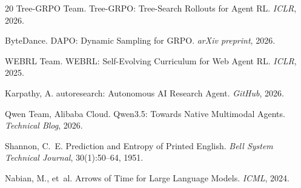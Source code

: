 \documentclass[11pt]{article}
\begin{document}
\begin{thebibliography}{20}
Tree-GRPO Team.
\newblock Tree-GRPO: Tree-Search Rollouts for Agent RL.
\newblock \emph{ICLR}, 2026.

ByteDance.
\newblock DAPO: Dynamic Sampling for GRPO.
\newblock \emph{arXiv preprint}, 2026.

WEBRL Team.
\newblock WEBRL: Self-Evolving Curriculum for Web Agent RL.
\newblock \emph{ICLR}, 2025.

Karpathy, A.
\newblock autoresearch: Autonomous AI Research Agent.
\newblock \emph{GitHub}, 2026.

Qwen Team, Alibaba Cloud.
\newblock Qwen3.5: Towards Native Multimodal Agents.
\newblock \emph{Technical Blog}, 2026.

Shannon, C.~E.
\newblock Prediction and Entropy of Printed English.
\newblock \emph{Bell System Technical Journal}, 30(1):50--64, 1951.

Nabian, M., et~al.
\newblock Arrows of Time for Large Language Models.
\newblock \emph{ICML}, 2024.

\end{thebibliography}
\end{document}

